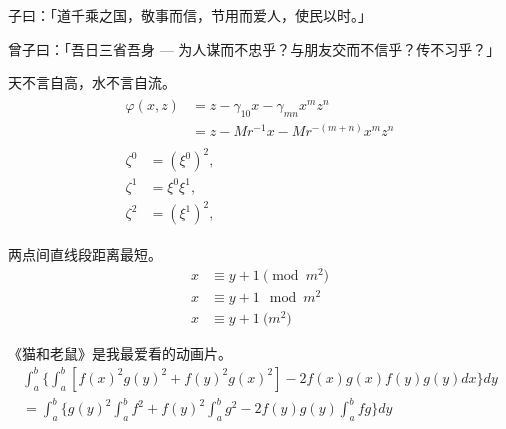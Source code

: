 				\begin{definition}
					\label{thm-definition-example}
					子曰：「道千乘之国，敬事而信，节用而爱人，使民以时。」
				\end{definition}
				
				\begin{proposition}
					\label{thm-proposition-example}
					曾子曰：「吾日三省吾身 --- 为人谋而不忠乎？与朋友交而不信乎？传不习乎？」
				\end{proposition}
				
				\begin{remark}
					\label{thm-remark-example}
					天不言自高，水不言自流。
					\begin{gather*}
						\begin{split}
							\varphi(x,z)
							& = z-\gamma_{10}x-\gamma_{mn}x^mz^n\\
							& = z-Mr^{-1}x-Mr^{-(m+n)}x^mz^n
						\end{split} \\[6pt]
						\begin{align}
							\zeta^0 & = (\xi^0)^2,\\
							\zeta^1 & = \xi^0\xi^1,\\
							\zeta^2 & = (\xi^1)^2,
						\end{align}
					\end{gather*}
				\end{remark}
				
				\begin{axiom}
					\label{thm-axiom-example}
					两点间直线段距离最短。
					\begin{align}
						x & \equiv y+1\pmod{m^2}\\
						x & \equiv y+1\mod{m^2}\\
						x & \equiv y+1\pod{m^2}
					\end{align}
				\end{axiom}
				
				\begin{lemma}
					\label{thm-lemma-example}
					《猫和老鼠》是我最爱看的动画片。
					\begin{multline*}%
						\int_a^b\biggl\{\int_a^b[f(x)^2g(y)^2+f(y)^2g(x)^2]
						-2f(x)g(x)f(y)g(y)dx\biggr\}dy \\
						=\int_a^b\biggl\{g(y)^2\int_a^bf^2
						+f(y)^2\int_a^bg^2-2f(y)g(y)\int_a^b fg\biggr\}dy
					\end{multline*}
				\end{lemma}
				

